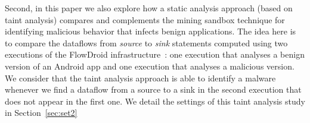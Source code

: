 



Second, in this paper we also explore how a static analysis approach
(based on taint analysis) compares and complements the mining sandbox technique
for identifying malicious behavior that infects benign applications.
The idea here is to compare the dataflows from \emph{source} to
\emph{sink} statements computed using two executions of the
FlowDroid infrastructure~\cite{arzt:pldi-2014}: one execution that analyses
a benign version of an Android app and one execution that
analyses a malicious version. We consider that
the taint analysis approach is able to identify a malware whenever
we find a dataflow from a source to a sink in the second execution
that does not appear in the first one. We detail the
settings of this taint analysis study in Section~\ref{sec:set2}

